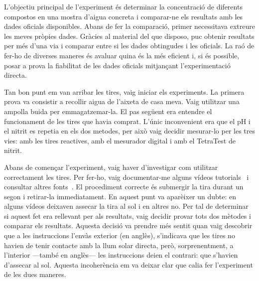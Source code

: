 L’objectiu principal de l'experiment és determinar la concentració de diferents compostos en una mostra d’aigua concreta i comparar-ne els resultats amb les dades oficials disponibles. Abans de fer la comparació, primer necessitava extreure les meves pròpies dades. Gràcies al material del que disposo, puc obtenir resultats per més d’una via i comparar entre si les dades obtingudes i les oficials. La raó de fer-ho de diverses maneres és avaluar quina és la més eficient i, si és possible, posar a prova la fiabilitat de les dades oficials mitjançant l’experimentació directa.

Tan bon punt em van arribar les tires, vaig iniciar els experiments. La primera prova va consistir a recollir aigua de l’aixeta de casa meva. Vaig utilitzar una ampolla buida per emmagatzemar-la. El pas següent era entendre el funcionament de les tires que havia comprat. L’únic inconvenient era que el pH i el nitrit es repetia en els dos metodes, per això vaig decidir mesurar-lo per les tres vies: amb les tires reactives, amb el mesurador digital i amb el TetraTest de nitrit.


Abans de començar l'experiment, vaig haver d’investigar com utilitzar correctament les tires. Per fer-ho, vaig documentar-me alguns vídeos tutorials~\cite{VideosDeSuport} i consultar altres fonts~\cite{FontsPerTires}. El procediment correcte és submergir la tira durant un segon i retirar-la immediatament. En aquest punt va aparèixer un dubte: en alguns vídeos deixaven assecar la tira al sol i en altres no. Per tal de determinar si aquest fet era rellevant per als resultats, vaig decidir provar tots dos mètodes i comparar els resultats. Aquesta decisió va prendre més sentit quan vaig descobrir que a les instruccions l’envàs exterior (en anglès), s’indicava que les tires no havien de tenir contacte amb la llum solar directa, però, sorprenentment, a l’interior —també en anglès— les instruccions deien el contrari: que s’havien d’assecar al sol. Aquesta incoherència em va deixar clar que calia fer l’experiment de les dues maneres.


